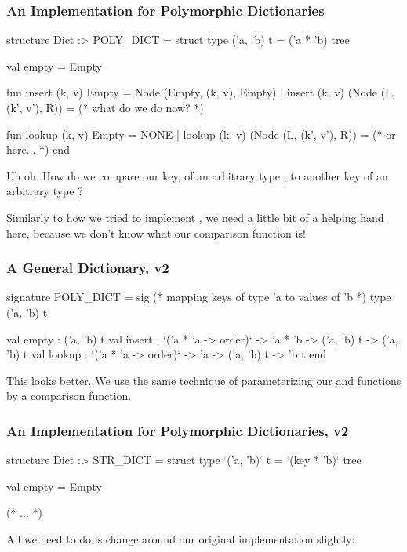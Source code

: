 \documentclass[aspectratio=169]{beamer}
\begin{document}
\begin{frame}[fragile]
  \frametitle{An Implementation for Polymorphic Dictionaries}

  \begin{codeblock}
    structure Dict :> POLY_DICT =
      struct
        type ('a, 'b) t = ('a * 'b) tree

        val empty = Empty

        fun insert (k, v) Empty = Node (Empty, (k, v), Empty)
          | insert (k, v) (Node (L, (k', v'), R)) = 
              (* what do we do now? *)

        fun lookup (k, v) Empty = NONE 
          | lookup (k, v) (Node (L, (k', v'), R)) =
              (* or here... *)
    end
  \end{codeblock}

  Uh oh. How do we compare our key, of an arbitrary type , to 
  another key of an arbitrary type ?\footnotemark

  Similarly to how we tried to implement ,
  we need a little bit of a helping hand here, because we don't know what
  our comparison function is! 

\end{frame}

\begin{frame}[fragile]
  \frametitle{A General Dictionary, v2}

  {\small
  \begin{codeblock}
    signature POLY_DICT =
      sig
        (* mapping keys of type 'a to values of 'b *)
        type ('a, 'b) t

        val empty : ('a, 'b) t
        val insert : 
          `('a * 'a -> order)` -> 'a * 'b -> ('a, 'b) t -> ('a, 'b) t
        val lookup : 
          `('a * 'a -> order)` -> 'a -> ('a, 'b) t -> 'b t
      end
  \end{codeblock}
  }

  This looks better. We use the same technique of parameterizing our
   and  functions by a comparison function.
\end{frame}

\begin{frame}[fragile]
  \frametitle{An Implementation for Polymorphic Dictionaries, v2}

  \begin{codeblock}
    structure Dict :> STR_DICT =
      struct 
        type `('a, 'b)` t = `(key * 'b)` tree 

        val empty = Empty
       
        (* ... *)
  \end{codeblock}

  All we need to do is change around our original implementation slightly:
\end{frame}
\end{document}
